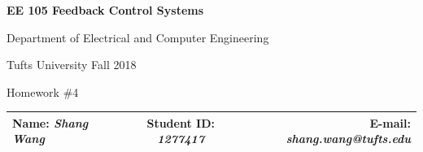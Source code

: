\documentclass[a4paper]{article}
\begin{document}
\begin{center}
\bf\Large
EE 105 Feedback Control Systems\par
Department of Electrical and Computer Engineering\par
Tufts University Fall 2018\par
Homework \#4\par   
\end{center}
\begin{table}[H]
\begin{center}
\begin{tabular*}{\textwidth}{@{\extracolsep{\fill}}lcr}
Name: {\it Shang Wang} &Student ID: {\it 1277417} &E-mail: {\it shang.wang@tufts.edu}\\
\hline
\end{tabular*}
\end{center}
\end{table}
\end{document}
